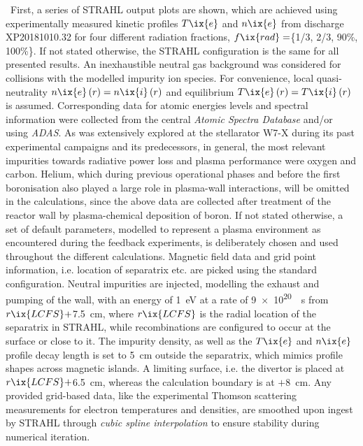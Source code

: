         \,\newline%
        First, a series of STRAHL output plots are shown, which are achieved using experimentally measured kinetic profiles $T\ix{e}$ and $n\ix{e}$ from discharge XP20181010.32 for four different radiation fractions, $f\ix{rad}=$\{1/3, 2/3, 90\%, 100\%\}. If not stated otherwise, the STRAHL configuration is the same for all presented results. An inexhaustible neutral gas background was considered for collisions with the modelled impurity ion species. For convenience, local quasi-neutrality $n\ix{e}\left(r\right)=n\ix{i}\left(r\right)$ and equilibrium $T\ix{e}\left(r\right)=T\ix{i}\left(r\right)$ is assumed. Corresponding data for atomic energies levels and spectral information were collected from the central \textit{Atomic Spectra Database}\cite{AtomicSpectra} and/or using \textit{ADAS}\cite{ADAS}. As was extensively explored at the stellarator W7-X during its past experimental campaigns and its predecessors\cite{Hirsch2008}, in general, the most relevant impurities towards radiative power loss and plasma performance were oxygen and carbon\cite{Wang2020,Sereda2020,Klinger2016}. Helium, which during previous operational phases and before the first boronisation also played a large role in plasma-wall interactions, will be omitted in the calculations, since the above data are collected after treatment of the reactor wall by plasma-chemical deposition of boron. If not stated otherwise, a set of default parameters, modelled to represent a plasma environment as encountered during the feedback experiments, is deliberately chosen and used throughout the different calculations. Magnetic field data and grid point information, i.e. location of separatrix etc. are picked using the standard configuration. Neutral impurities are injected, modelling the exhaust and pumping of the wall, with an energy of \SI{1}{\electronvolt} at a rate of \SI{9e20}{\per\second} from $r\ix{LCFS}+$\SI{7.5}{\centi\meter}, where $r\ix{LCFS}$ is the radial location of the separatrix in STRAHL, while recombinations are configured to occur at the surface or close to it. The impurity density, as well as the $T\ix{e}$ and $n\ix{e}$ profile decay length is set to \SI{5}{\centi\meter} outside the separatrix, which mimics profile shapes across magnetic islands. A limiting surface, i.e. the divertor is placed at $r\ix{LCFS}+$\SI{6.5}{\centi\meter}, whereas the calculation boundary is at $+$\SI{8}{\centi\meter}. Any provided grid-based data, like the experimental Thomson scattering measurements for electron temperatures and densities, are smoothed upon ingest by STRAHL through \textit{cubic spline interpolation} to ensure stability during numerical iteration.\\%
